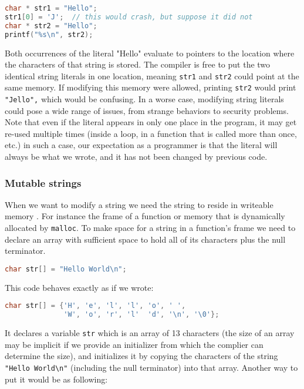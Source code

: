 \documentclass[12pt,a4paper]{article}
\begin{document}
\begin{lstlisting}[language=C]
char * str1 = "Hello";
str1[0] = 'J';  // this would crash, but suppose it did not
char * str2 = "Hello";
printf("%s\n", str2);
\end{lstlisting}

Both occurrences of the literal "Hello" evaluate to pointers to the location
where the characters of that string is stored. The compiler is free to put the
two identical string literals in one location, meaning \verb|str1| and
\verb|str2| could point at the same memory. If modifying this memory were
allowed, printing \verb|str2| would print \verb|"Jello",| which would be
confusing. In a worse case, modifying string literals could pose a wide range
of issues, from strange behaviors to security problems. Note that even if the
literal appears in only one place in the program, it may get re-used multiple
times (inside a loop, in a function that is called more than once, etc.) in
such a case, our expectation as a programmer is that the literal will always be
what we wrote, and it has not been changed by previous code.

\subsubsection{Mutable strings}

When we want to modify a string we need the string to reside in writeable memory
. For instance the frame of a function or memory that is dynamically allocated
by \verb|malloc|. To make space for a string in a function's frame we need to
declare an array with sufficient space to hold all of its characters plus the 
null terminator.

\begin{lstlisting}[language=C]
char str[] = "Hello World\n";
\end{lstlisting}

This code behaves exactly as if we wrote:

\begin{lstlisting}[language=C]
char str[] = {'H', 'e', 'l', 'l', 'o', ' ',
              'W', 'o', 'r', 'l'  'd', '\n', '\0'};
\end{lstlisting}

It declares a variable \verb|str| which is an array of 13 characters (the size
of an array may be implicit if we provide an initializer from which the
complier can determine the size), and initializes it by copying the characters 
of the string \verb|"Hello World\n"| (including the null terminator) into that
array. Another way to put it would be as following:
\end{document}
